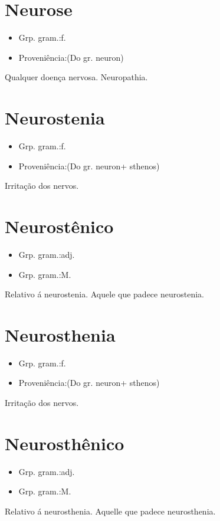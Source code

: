 \section{Neurose}
\begin{itemize}
\item {Grp. gram.:f.}
\end{itemize}
\begin{itemize}
\item {Proveniência:(Do gr. \textunderscore neuron\textunderscore )}
\end{itemize}
Qualquer doença nervosa.
Neuropathia.
\section{Neurostenia}
\begin{itemize}
\item {Grp. gram.:f.}
\end{itemize}
\begin{itemize}
\item {Proveniência:(Do gr. \textunderscore neuron\textunderscore  + \textunderscore sthenos\textunderscore )}
\end{itemize}
Irritação dos nervos.
\section{Neurostênico}
\begin{itemize}
\item {Grp. gram.:adj.}
\end{itemize}
\begin{itemize}
\item {Grp. gram.:M.}
\end{itemize}
Relativo á neurostenia.
Aquele que padece neurostenia.
\section{Neurosthenia}
\begin{itemize}
\item {Grp. gram.:f.}
\end{itemize}
\begin{itemize}
\item {Proveniência:(Do gr. \textunderscore neuron\textunderscore  + \textunderscore sthenos\textunderscore )}
\end{itemize}
Irritação dos nervos.
\section{Neurosthênico}
\begin{itemize}
\item {Grp. gram.:adj.}
\end{itemize}
\begin{itemize}
\item {Grp. gram.:M.}
\end{itemize}
Relativo á neurosthenia.
Aquelle que padece neurosthenia.
